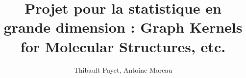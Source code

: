 \documentclass[usepdftitle=false]{beamer}
\title{Projet pour la statistique en grande dimension : Graph Kernels for Molecular Structures, etc.}
\author{Thibault Payet, Antoine Moreau}
\date{}
\begin{document}
    \begin{frame}
    \titlepage
    \end{frame}


    
    
    
\end{document}
